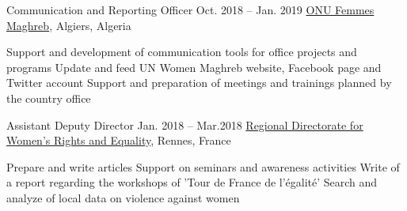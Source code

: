 \begin{joblist}[13.2][7.8][3.4]

\item[Communication and Reporting Officer]{Oct. 2018 -- Jan. 2019 }     
	{
	\href{http://maghreb.unwomen.org/fr}{ONU Femmes Maghreb}, Algiers, Algeria
	}     
	{
			 
		\vspace{-0.5cm}
		\begin{itemize}
			  \iftbftiny \setlength\itemsep{-3pt} \fi
			  \cvitem[\checkmark] Support and development of communication tools for office projects and programs     
 			  \cvitem[\checkmark] Update and feed UN Women Maghreb website, Facebook page and Twitter account                                                         
			  \cvitem[\checkmark] Support and preparation of meetings and trainings planned by the country office
		\end{itemize}      

	}

\item[Assistant Deputy Director]{Jan. 2018 -- Mar.2018 }     
  	{
	\href{https://www.egalite-femmes-hommes.gouv.fr/le-secretariat-d-etat/organisation-du-ministere/services-territoriaux/annuaire-des-equipes-regionales-et-departementales/}{Regional Directorate for Women's Rights and Equality}, Rennes, France
	}
  	{
        \vspace{-0.5cm}
		\iftbftiny \setlength{\parskip}{-10pt} \fi
		\begin{itemize}
			  \iftbftiny \setlength\itemsep{-3pt} \fi
			  \cvitem[\checkmark] Prepare and write articles
			  \cvitem[\checkmark] Support on seminars and awareness activities
			  \cvitem[\checkmark] Write of a report regarding the workshops of 'Tour de France de l'égalité'
			  \cvitem[\checkmark] Search and analyze of local data on violence against women
		\end{itemize}       
	}



\end{joblist}
